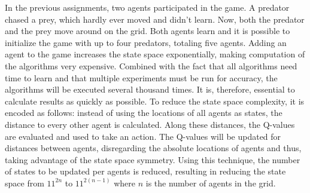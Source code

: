 In the previous assignments, two agents participated in the game. A predator chased a prey, which hardly ever moved and didn't learn. Now, both the predator and the prey move around on the grid. Both agents learn and it is possible to initialize the game with up to four predators, totaling five agents. Adding an agent to the game increases the state space exponentially, making computation of the algorithms very expensive. Combined with the fact that all algorithms need time to learn and that multiple experiments must be run for accuracy, the algorithms will be executed several thousand times. It is, therefore, essential to calculate results as quickly as possible. To reduce the state space complexity, it is encoded as follows:  instead of using the locations of all agents as states, the distance to every other agent is calculated. Along these distances, the Q-values are evaluated and used to take an action. The Q-values will be updated for distances between agents, disregarding the absolute locations of agents and thus, taking advantage of the state space symmetry. Using this technique, the number of states to be updated per agents is reduced, resulting in reducing the state space from $11^{2n}$ to $11^{2(n-1)}$ where $n$ is the number of agents in the grid.